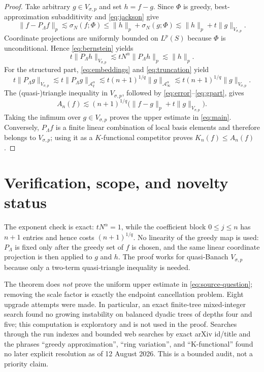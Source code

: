 \documentclass[10pt]{article}
\newcommand{\A}{\mathcal A}
\newcommand{\V}{V_{\sigma,p}}
\newcommand{\norm}[1]{\lVert #1\rVert}
\begin{document}
\begin{proof}
Take arbitrary $g\in\V$ and set $h=f-g$.  Since $\Phi$ is greedy,
best-approximation subadditivity and \eqref{eq:jackson} give
\begin{equation}\label{eq:error}
 \norm{f-P_\Lambda f}_p
 \lesssim \sigma_N(f;\Phi)
 \le \norm h_p+\sigma_N(g;\Phi)
 \lesssim \norm h_p+t\norm g_{\V}.
\end{equation}
Coordinate projections are uniformly bounded on $L^p(S)$ because $\Phi$ is
unconditional.  Hence \eqref{eq:bernstein} yields
\begin{equation}\label{eq:hpart}
 t\norm{P_\Lambda h}_{\V}
 \lesssim tN^\alpha\norm{P_\Lambda h}_p
 \lesssim \norm h_p.
\end{equation}
For the structured part, \eqref{eq:embeddings} and
\eqref{eq:truncation} yield
\begin{equation}\label{eq:gpart}
 t\norm{P_\Lambda g}_{\V}
 \lesssim t\norm{P_\Lambda g}_{\A_q^\alpha}
 \lesssim t(n+1)^{1/q}\norm g_{\A_\infty^\alpha}
 \lesssim t(n+1)^{1/q}\norm g_{\V}.
\end{equation}
The (quasi-)triangle inequality in $\V$, followed by
\eqref{eq:error}--\eqref{eq:gpart}, gives
\[
 A_n(f)\lesssim(n+1)^{1/q}
    \bigl(\norm{f-g}_p+t\norm g_{\V}\bigr).
\]
Taking the infimum over $g\in\V$ proves the upper estimate in
\eqref{eq:main}.  Conversely, $P_\Lambda f$ is a finite linear combination
of local basis elements and therefore belongs to $\V$; using it as a
$K$-functional competitor proves $K_n(f)\le A_n(f)$.
\end{proof}

\section*{Verification, scope, and novelty status}

The exponent check is exact: $tN^\alpha=1$, while the coefficient block
$0\le j\le n$ has $n+1$ entries and hence costs $(n+1)^{1/q}$.  No
linearity of the greedy map is used: $P_\Lambda$ is fixed only after the
greedy set of $f$ is chosen, and the same linear coordinate projection is
then applied to $g$ and $h$.  The proof works for quasi-Banach
$V_{\sigma,p}$ because only a two-term quasi-triangle inequality is needed.

The theorem does \emph{not} prove the uniform upper estimate in
\eqref{eq:source-question}; removing the scale factor is exactly the endpoint
cancellation problem.  Eight upgrade attempts were made.  In particular, an
exact finite-tree mixed-integer search found no growing instability on
balanced dyadic trees of depths four and five; this computation is exploratory
and is not used in the proof.  Searches through the run indexes and bounded
web searches by exact arXiv id/title and the phrases ``greedy approximation'',
``ring variation'', and ``K-functional'' found no later explicit resolution as
of 12 August 2026.  This is a bounded audit, not a priority claim.
\end{document}
